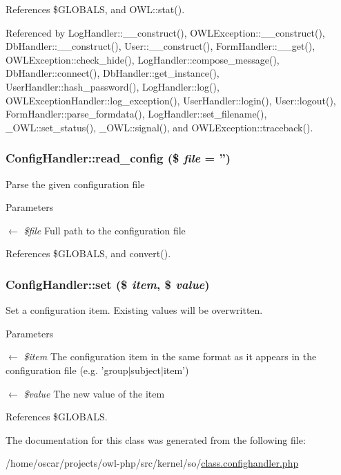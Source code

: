 References \$GLOBALS, and OWL::stat().



Referenced by LogHandler::\_\-\_\-construct(), OWLException::\_\-\_\-construct(), DbHandler::\_\-\_\-construct(), User::\_\-\_\-construct(), FormHandler::\_\-\_\-get(), OWLException::check\_\-hide(), LogHandler::compose\_\-message(), DbHandler::connect(), DbHandler::get\_\-instance(), UserHandler::hash\_\-password(), LogHandler::log(), OWLExceptionHandler::log\_\-exception(), UserHandler::login(), User::logout(), FormHandler::parse\_\-formdata(), LogHandler::set\_\-filename(), \_\-OWL::set\_\-status(), \_\-OWL::signal(), and OWLException::traceback().

\subsubsection[{read\_\-config}]{\setlength{\rightskip}{0pt plus 5cm}ConfigHandler::read\_\-config (\$ {\em file} = {\ttfamily ''})}\label{classConfigHandler_a75a7f03f156cd0f315f91ec4bbddfbb6}
Parse the given configuration file


\begin{DoxyParams}{Parameters}
\item[\mbox{$\leftarrow$} {\em \$file}]Full path to the configuration file \end{DoxyParams}


References \$GLOBALS, and convert().

\subsubsection[{set}]{\setlength{\rightskip}{0pt plus 5cm}ConfigHandler::set (\$ {\em item}, \/  \$ {\em value})}\label{classConfigHandler_ac947c34c710d66558da03ff632c32075}
Set a configuration item. Existing values will be overwritten.


\begin{DoxyParams}{Parameters}
\item[\mbox{$\leftarrow$} {\em \$item}]The configuration item in the same format as it appears in the configuration file (e.g. 'group$|$subject$|$item') \item[\mbox{$\leftarrow$} {\em \$value}]The new value of the item \end{DoxyParams}


References \$GLOBALS.



The documentation for this class was generated from the following file:\begin{DoxyCompactItemize}
\item 
/home/oscar/projects/owl-\/php/src/kernel/so/\hyperlink{class_8confighandler_8php}{class.confighandler.php}\end{DoxyCompactItemize}
